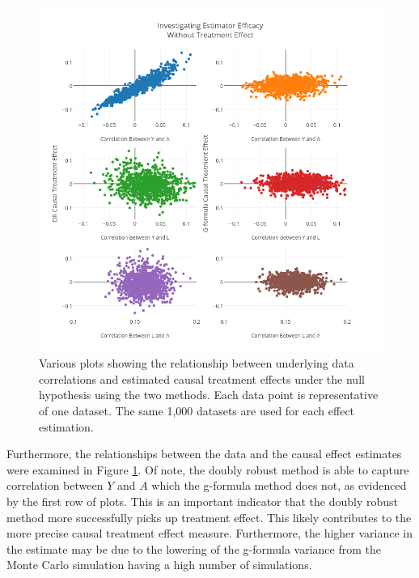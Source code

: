  
\begin{figure}[h!]
\begin{centering}
\includegraphics[width = \linewidth]{figures/correlation.png}
\caption[Scatterplots of relationships between estimates and data correlations under the null hypothesis]{Various plots showing the relationship between underlying data correlations and estimated causal treatment effects under the null hypothesis using the two methods.  Each data point is representative of one dataset.  The same 1,000 datasets are used for each effect estimation.}
\label{correlation}
\end{centering}
\end{figure}

Furthermore, the relationships between the data and the causal effect estimates were examined in Figure \ref{correlation}.  Of note, the doubly robust method is able to capture correlation between $Y$ and $A$ which the g-formula method does not, as evidenced by the first row of plots.  This is an important indicator that the doubly robust method more successfully picks up treatment effect.  This likely contributes to the more precise causal treatment effect measure.  Furthermore, the higher variance in the estimate may be due to the lowering of the g-formula variance from the Monte Carlo simulation having a high number of simulations.  


